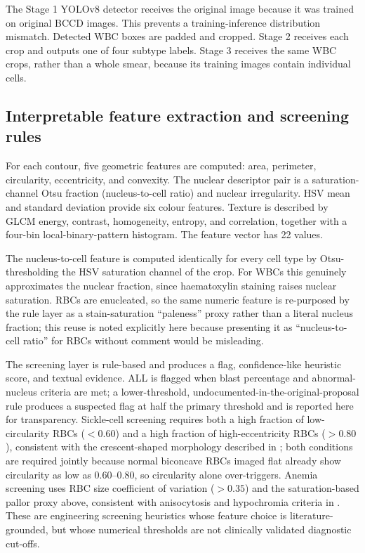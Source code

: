 \documentclass[conference]{IEEEtran}
\begin{document}
The Stage 1 YOLOv8 detector receives the original image because it was trained on original BCCD images. This prevents a training-inference distribution mismatch. Detected WBC boxes are padded and cropped. Stage 2 receives each crop and outputs one of four subtype labels. Stage 3 receives the same WBC crops, rather than a whole smear, because its training images contain individual cells.

\subsection{Interpretable feature extraction and screening rules}

For each contour, five geometric features are computed: area, perimeter, circularity, eccentricity, and convexity. The nuclear descriptor pair is a saturation-channel Otsu fraction (nucleus-to-cell ratio) and nuclear irregularity. HSV mean and standard deviation provide six colour features. Texture is described by GLCM energy, contrast, homogeneity, entropy, and correlation, together with a four-bin local-binary-pattern histogram. The feature vector has 22 values.

The nucleus-to-cell feature is computed identically for every cell type by Otsu-thresholding the HSV saturation channel of the crop. For WBCs this genuinely approximates the nuclear fraction, since haematoxylin staining raises nuclear saturation. RBCs are enucleated, so the same numeric feature is re-purposed by the rule layer as a stain-saturation ``paleness'' proxy rather than a literal nucleus fraction; this reuse is noted explicitly here because presenting it as ``nucleus-to-cell ratio'' for RBCs without comment would be misleading.

The screening layer is rule-based and produces a flag, confidence-like heuristic score, and textual evidence. ALL is flagged when blast percentage and abnormal-nucleus criteria are met; a lower-threshold, undocumented-in-the-original-proposal rule produces a suspected flag at half the primary threshold and is reported here for transparency. Sickle-cell screening requires both a high fraction of low-circularity RBCs ($<0.60$) and a high fraction of high-eccentricity RBCs ($>0.80$), consistent with the crescent-shaped morphology described in \cite{ref_bain,ref_xu}; both conditions are required jointly because normal biconcave RBCs imaged flat already show circularity as low as 0.60--0.80, so circularity alone over-triggers. Anemia screening uses RBC size coefficient of variation ($>0.35$) and the saturation-based pallor proxy above, consistent with anisocytosis and hypochromia criteria in \cite{ref_bain,ref_who}. These are engineering screening heuristics whose feature choice is literature-grounded, but whose numerical thresholds are not clinically validated diagnostic cut-offs.
\end{document}
